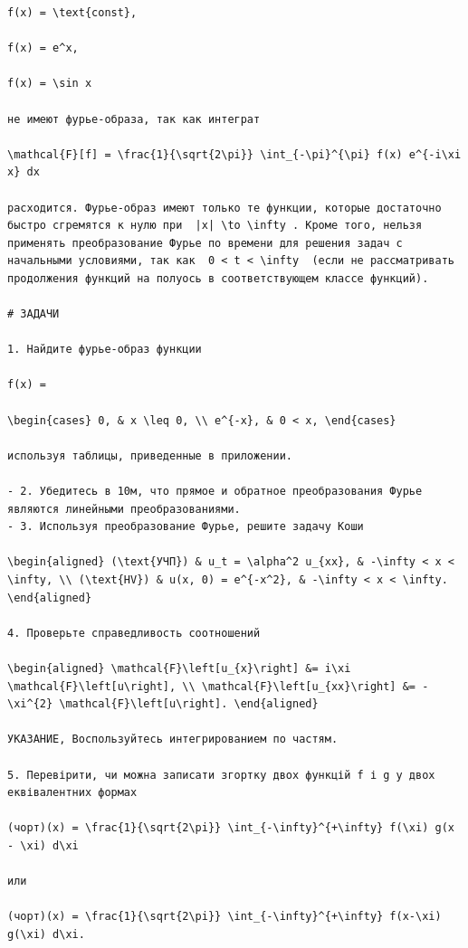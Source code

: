 \documentclass[
  ukrainian,
]{article}
\begin{document}
\begin{verbatim}
f(x) = \text{const},

f(x) = e^x,

f(x) = \sin x

не имеют фурье-образа, так как интеграт

\mathcal{F}[f] = \frac{1}{\sqrt{2\pi}} \int_{-\pi}^{\pi} f(x) e^{-i\xi x} dx

расходится. Фурье-образ имеют только те функции, которые достаточно быстро сгремятся к нулю при  |x| \to \infty . Кроме того, нельзя применять преобразование Фурье по времени для решения задач с начальными условиями, так как  0 < t < \infty  (если не рассматривать продолжения функций на полуось в соответствующем классе функций).

# ЗАДАЧИ

1. Найдите фурье-образ функции

f(x) =

\begin{cases} 0, & x \leq 0, \\ e^{-x}, & 0 < x, \end{cases}

используя таблицы, приведенные в приложении.

- 2. Убедитесь в 10м, что прямое и обратное преобразования Фурье являются линейными преобразованиями.
- 3. Используя преобразование Фурье, решите задачу Коши

\begin{aligned} (\text{УЧП}) & u_t = \alpha^2 u_{xx}, & -\infty < x < \infty, \\ (\text{HV}) & u(x, 0) = e^{-x^2}, & -\infty < x < \infty. \end{aligned}

4. Проверьте справедливость соотношений

\begin{aligned} \mathcal{F}\left[u_{x}\right] &= i\xi \mathcal{F}\left[u\right], \\ \mathcal{F}\left[u_{xx}\right] &= -\xi^{2} \mathcal{F}\left[u\right]. \end{aligned}

УКАЗАНИЕ, Воспользуйтесь интегрированием по частям.

5. Перевірити, чи можна записати згортку двох функцій f і g у двох еквівалентних формах

(чорт)(x) = \frac{1}{\sqrt{2\pi}} \int_{-\infty}^{+\infty} f(\xi) g(x - \xi) d\xi

или

(чорт)(x) = \frac{1}{\sqrt{2\pi}} \int_{-\infty}^{+\infty} f(x-\xi) g(\xi) d\xi.


\end{verbatim}
\end{document}
